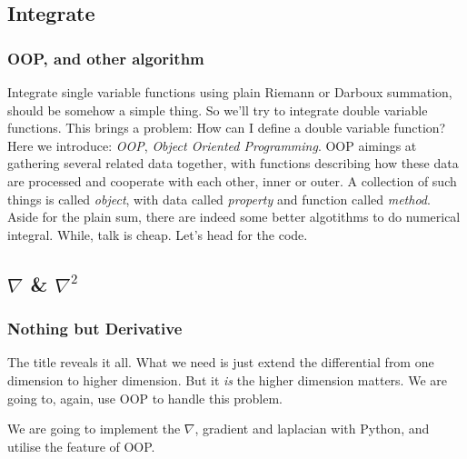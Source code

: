 \documentclass[compress,xcolor={dvipsnames}]{beamer}
\begin{document}
\subsection{Integrate}
\begin{frame}
    \frametitle{OOP, and other algorithm}
    Integrate single variable functions using plain Riemann or Darboux summation, should be somehow a simple thing. So we'll
    try to integrate double variable functions. This brings a problem: How can I define a double variable function? Here we introduce:
    \emph{OOP}, \emph{Object Oriented Programming}.
    \bigbreak
    \pause
    OOP aimings at gathering several related data together, with functions describing how these data are processed and cooperate with each other, inner or outer.
    A collection of such things is called \emph{object}, with data called \emph{property} and function called \emph{method}.
    \bigbreak
    \pause
    Aside for the plain sum, there are indeed some better algotithms to do numerical integral. While, talk is cheap. Let's head for the code.

\end{frame}

\subsection{\texorpdfstring{$\nabla$}{nabla} \& \texorpdfstring{$\nabla^2$}{nabla\^{}2}}
\begin{frame}
    \frametitle{Nothing but Derivative}
    The title reveals it all. What we need is just extend the differential from one dimension to higher dimension. 
    \bigbreak
    \pause
    But it \emph{is} the higher dimension matters. We are going to, again, use OOP to handle this problem.
    \bigbreak
    \pause

    We are going to implement the \(\nabla\), gradient and laplacian with Python, and utilise the feature of OOP.
\end{frame}
\end{document}
